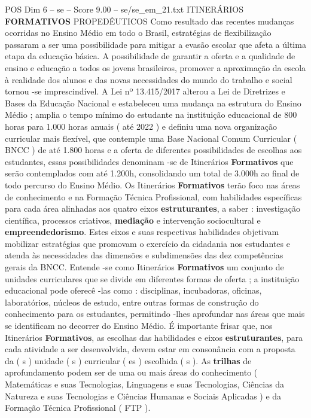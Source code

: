\begin{textsample}{POS Dim 6 – se – Score 9.00 – se/se\_em\_21.txt}  \label{ex:f6_pos_044}
ITINERÁRIOS \textbf{FORMATIVOS} PROPEDÊUTICOS Como resultado das recentes mudanças ocorridas no Ensino Médio em todo o Brasil, estratégias de flexibilização passaram a ser uma possibilidade para mitigar a evasão escolar que afeta a última etapa da educação básica.
A possibilidade de garantir a oferta e a qualidade de ensino e educação a todos os jovens brasileiros, promover a aproximação da escola à realidade dos alunos e das novas necessidades do mundo do trabalho e social tornou -se imprescindível.
A Lei nº 13.415/2017 alterou a Lei de Diretrizes e Bases da Educação Nacional e estabeleceu uma mudança na estrutura do Ensino Médio ; amplia o tempo mínimo do estudante na instituição educacional de 800 horas para 1.000 horas anuais ( até 2022 ) e definiu uma nova organização curricular mais flexível, que contemple uma Base Nacional Comum Curricular ( BNCC ) de até 1.800 horas e a oferta de diferentes possibilidades de escolhas aos estudantes, essas possibilidades denominam -se de Itinerários \textbf{Formativos} que serão contemplados com até 1.200h, consolidando um total de 3.000h ao final de todo percurso do Ensino Médio.
Os Itinerários \textbf{Formativos} terão foco nas áreas de conhecimento e na Formação Técnica Profissional, com habilidades específicas para cada área alinhadas aos quatro eixos \textbf{estruturantes}, a saber : investigação científica, processos criativos, \textbf{mediação} e intervenção sociocultural e \textbf{empreendedorismo}.
Estes eixos e suas respectivas habilidades objetivam mobilizar estratégias que promovam o exercício da cidadania nos estudantes e atenda às necessidades das dimensões e subdimensões das dez competências gerais da BNCC.
Entende -se como Itinerários \textbf{Formativos} um conjunto de unidades curriculares que se divide em diferentes formas de oferta ; a instituição educacional pode oferecê -las como : disciplinas, incubadoras, oficinas, laboratórios, núcleos de estudo, entre outras formas de construção do conhecimento para os estudantes, permitindo -lhes aprofundar nas áreas que mais se identificam no decorrer do Ensino Médio.
É importante frisar que, nos Itinerários \textbf{Formativos}, as escolhas das habilidades e eixos \textbf{estruturantes}, para cada atividade a ser desenvolvida, devem estar em consonância com a proposta da ( s ) unidade ( s ) curricular ( es ) escolhida ( s ).
As \textbf{trilhas} de aprofundamento podem ser de uma ou mais áreas do conhecimento ( Matemáticas e suas Tecnologias, Linguagens e suas Tecnologias, Ciências da Natureza e suas Tecnologias e Ciências Humanas e Sociais Aplicadas ) e da Formação Técnica Profissional ( FTP ).

\end{textsample}
